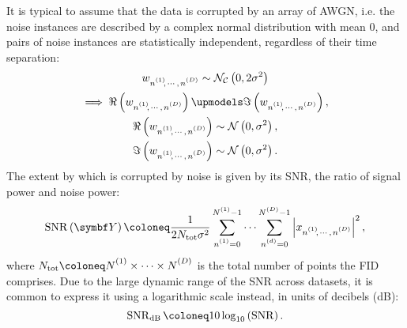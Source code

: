 It is typical to assume that the data is corrupted by an array of \ac{AWGN},
i.e. the noise instances are described by a complex normal distribution with
mean 0, and pairs of noise instances are statistically independent, regardless
of their time separation:
\begin{subequations}
    \begin{gather}
        \wnonenD \sim
        \mathcal{N_C}\left(0, 2\sigma^2\right) \\
        \begin{gathered}
            \implies \Re\left(\wnonenD\right) \upmodels \Im\left(\wnonenD\right),\\
             \Re\left(\wnonenD\right) \sim \mathcal{N}\left(0, \sigma^2\right),\\
             \Im\left(\wnonenD\right) \sim \mathcal{N}\left(0, \sigma^2\right). \\
        \end{gathered}
    \end{gather}
\end{subequations}
The extent by which  is corrupted by noise is given by its \ac{SNR},
the ratio of signal power and noise power:
\begin{equation}
    \SNR\left(\bY\right) \coloneq
        \frac{1}{2 N_{\text{tot}} \sigma^2}
        \sum_{\none=0}^{\None-1} \cdots \sum_{\nd=0}^{\ND-1}
        \left \lvert \xnonenD \right \rvert^2,
        \label{eq:snr}
\end{equation}
where $N_{\text{tot}} \coloneq \None \times \cdots \times \ND$ is the total
number of points the \ac{FID} comprises. Due to the large dynamic range of the
\ac{SNR} across datasets, it is common to express it using a logarithmic scale
instead, in units of decibels (\unit{\deci\bel}):
\begin{equation}
    \SNR_{\unit{\deci\bel}} \coloneq 10 \log_{10} \left(\SNR\right).
    \label{eq:snr-db}
\end{equation}
